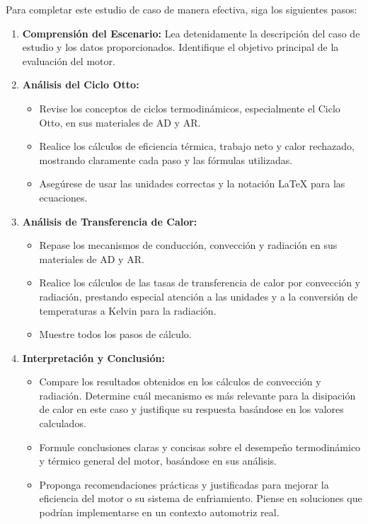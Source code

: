 \documentclass{article}
\begin{document}
Para completar este estudio de caso de manera efectiva, siga los siguientes pasos:

\begin{enumerate}
    \item \textbf{Comprensión del Escenario:} Lea detenidamente la descripción del caso de estudio y los datos proporcionados. Identifique el objetivo principal de la evaluación del motor.
    \item \textbf{Análisis del Ciclo Otto:}
    \begin{itemize}
        \item Revise los conceptos de ciclos termodinámicos, especialmente el Ciclo Otto, en sus materiales de AD y AR.
        \item Realice los cálculos de eficiencia térmica, trabajo neto y calor rechazado, mostrando claramente cada paso y las fórmulas utilizadas.
        \item Asegúrese de usar las unidades correctas y la notación LaTeX para las ecuaciones.
    \end{itemize}
    \item \textbf{Análisis de Transferencia de Calor:}
    \begin{itemize}
        \item Repase los mecanismos de conducción, convección y radiación en sus materiales de AD y AR.
        \item Realice los cálculos de las tasas de transferencia de calor por convección y radiación, prestando especial atención a las unidades y a la conversión de temperaturas a Kelvin para la radiación.
        \item Muestre todos los pasos de cálculo.
    \end{itemize}
    \item \textbf{Interpretación y Conclusión:}
    \begin{itemize}
        \item Compare los resultados obtenidos en los cálculos de convección y radiación. Determine cuál mecanismo es más relevante para la disipación de calor en este caso y justifique su respuesta basándose en los valores calculados.
        \item Formule conclusiones claras y concisas sobre el desempeño termodinámico y térmico general del motor, basándose en sus análisis.
        \item Proponga recomendaciones prácticas y justificadas para mejorar la eficiencia del motor o su sistema de enfriamiento. Piense en soluciones que podrían implementarse en un contexto automotriz real.

\end{itemize}
\end{enumerate}
\end{document}

